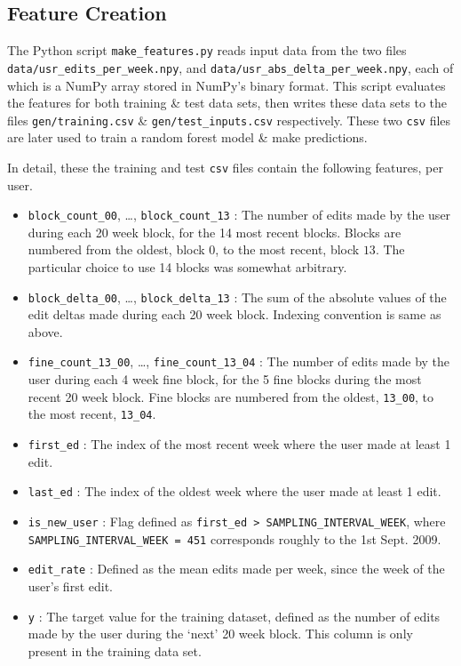 \documentclass[12pt]{article}
\begin{document}
\subsection{Feature Creation}

The Python script \verb+make_features.py+ reads input data from the two
files \verb+data/usr_edits_per_week.npy+, and \verb+data/usr_abs_delta_per_week.npy+,
each of which is a NumPy array stored in NumPy's binary format.
This script evaluates the features for both training \& test data sets, then writes
these data sets to the files \verb+gen/training.csv+ \& \verb+gen/test_inputs.csv+ respectively. These two \verb+csv+ files are later used to train a random forest model \& make
predictions.

In detail, these the training and test \verb+csv+ files contain the following features, per user.

\begin{itemize}
	\item \verb+block_count_00+, \ldots, \verb+block_count_13+ :
	The number of edits made by the user during each 20 week block, for the
	14 most recent blocks. Blocks are numbered from the oldest, block $0$, to the
	most recent, block $13$. The particular choice to use 14 blocks was 
	somewhat arbitrary.

	\item \verb+block_delta_00+, \ldots, \verb+block_delta_13+ :
	The sum of the absolute values of the edit deltas made during each 20 week block.
	Indexing convention is same as above.

	\item \verb+fine_count_13_00+, \ldots, \verb+fine_count_13_04+ :
	The number of edits made by the user during each 4 week fine block, for
	the 5 fine blocks during the most recent 20 week block. Fine blocks are numbered from
	the oldest, \verb+13_00+, to the most recent, \verb+13_04+.

	\item \verb+first_ed+ : 
	The index of the most recent week where the user made at least 1 edit.

	\item \verb+last_ed+ :
	The index of the oldest week where the user made at least 1 edit.

	\item \verb+is_new_user+ :
	Flag defined as \verb+first_ed > SAMPLING_INTERVAL_WEEK+, where
	\verb+SAMPLING_INTERVAL_WEEK = 451+ corresponds roughly to the 1st Sept. 2009.

	\item \verb+edit_rate+ :
	Defined as the mean edits made per week, since the week of the user's first edit.

	\item \verb+y+ :
	The target value for the training dataset, defined as the number of edits made
	by the user during the `next' 20 week block. This column is only present in
	the training data set.
\end{itemize}
\end{document}
